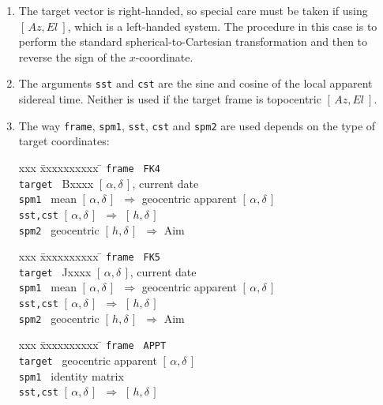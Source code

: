 \documentclass[12pt,fleqn,twoside]{article}
\renewcommand{\_}{{\tt\char'137}}     %
\newcommand{\radec}     {$[\,\alpha,\delta\,]$}
\newcommand{\hadec}     {$[\,h,\delta\,]$}
\newcommand{\azel}      {$[\,Az,El~]$}
\begin{document}
{\begin{enumerate}
      In the present case, the encoder demands required to image the
      specified sky target at the specified pointing-origin are
      calculated.
\item The target vector is right-handed, so special care must be taken
      if using \azel, which is a left-handed system.  The procedure in
      this case is to perform the standard spherical-to-Cartesian
      transformation and then to reverse the sign of the $x$-coordinate.
\item The arguments {\tt sst} and {\tt cst} are
      the sine and cosine of the local
      apparent sidereal time.  Neither is used if the target frame is
      topocentric \azel.
\item The way {\tt frame}, {\tt spm1}, {\tt sst}, {\tt cst} and
      {\tt spm2} are used depends on the type of target coordinates:
      \begin{tabbing}
         xxx \= xxxxxxxxxx \= \kill
         \> {\tt frame  } \> {\tt FK4} \\
         \> {\tt target } \> Bxxxx \radec, current date \\
         \> {\tt spm1   } \>
                 mean \radec\ $\Rightarrow$ geocentric apparent \radec \\
         \> {\tt sst,cst} \> \radec\ $\Rightarrow$ \hadec \\
         \> {\tt spm2   } \>  geocentric \hadec\ $\Rightarrow$ {\sc Aim}
      \end{tabbing}
      \begin{tabbing}
         xxx \= xxxxxxxxxx \= \kill
         \> {\tt frame  } \> {\tt FK5} \\
         \> {\tt target } \> Jxxxx \radec, current date \\
         \> {\tt spm1   } \>
                 mean \radec\ $\Rightarrow$ geocentric apparent \radec \\
         \> {\tt sst,cst} \> \radec\ $\Rightarrow$ \hadec \\
         \> {\tt spm2   } \> geocentric \hadec\ $\Rightarrow$ {\sc Aim}
      \end{tabbing}
      \begin{tabbing}
         xxx \= xxxxxxxxxx \= \kill
         \> {\tt frame  } \> {\tt APPT} \\
         \> {\tt target } \> geocentric apparent \radec \\
         \> {\tt spm1   } \> identity matrix \\
         \> {\tt sst,cst} \> \radec\ $\Rightarrow$ \hadec \\

\end{tabbing}
\end{enumerate}}
\end{document}
